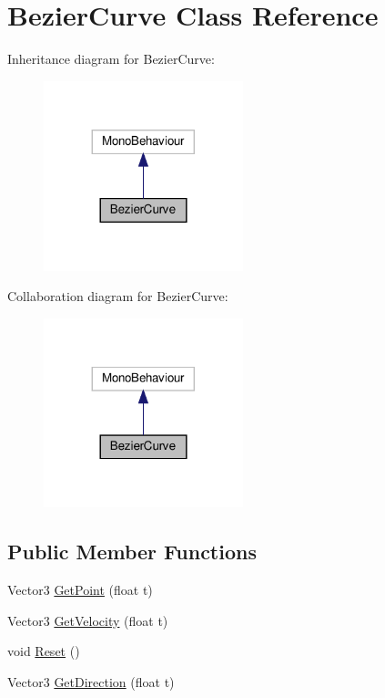 \hypertarget{classBezierCurve}{}\section{Bezier\+Curve Class Reference}
\label{classBezierCurve}


Inheritance diagram for Bezier\+Curve\+:\nopagebreak
\begin{figure}[H]
\begin{center}
\leavevmode
\includegraphics[width=164pt]{classBezierCurve__inherit__graph}
\end{center}
\end{figure}


Collaboration diagram for Bezier\+Curve\+:\nopagebreak
\begin{figure}[H]
\begin{center}
\leavevmode
\includegraphics[width=164pt]{classBezierCurve__coll__graph}
\end{center}
\end{figure}
\subsection*{Public Member Functions}
\begin{DoxyCompactItemize}
\item 
Vector3 \hyperlink{classBezierCurve_a0ac697a04b35213e11d9c93a183ee7fe}{Get\+Point} (float t)
\item 
Vector3 \hyperlink{classBezierCurve_a3b39e1db5e230d6c4a89ec0386779efa}{Get\+Velocity} (float t)
\item 
void \hyperlink{classBezierCurve_a75b57f3aa46a6bb6679dfa79262e29ad}{Reset} ()
\item 
Vector3 \hyperlink{classBezierCurve_aee84a49317214403c6f59c2a60903662}{Get\+Direction} (float t)
\end{DoxyCompactItemize}
